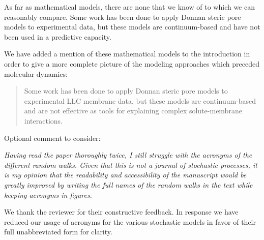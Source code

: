 \documentclass{article}
\begin{document}
\begin{enumerate}[label={Comment \theenumi :}, leftmargin=3.9\parindent]
		  As far as mathematical models, there are none that we know of to which we can reasonably
		  compare. Some work has been done to apply Donnan steric pore models to experimental data, 
		  but these models are continuum-based and have not been used in a predictive capacity.
		  
		  We have added a mention of these mathematical models to the introduction in order to give
		  a more complete picture of the modeling approaches which preceded molecular dynamics:
		  \begin{quote}
		    Some work has been done to apply Donnan steric pore models to experimental LLC membrane 
		    data, but these models are continuum-based and are not effective as tools for explaining
		    complex solute-membrane interactions.~\cite{hatakeyama_water_2011}
		  \end{quote}
		  
  \end{enumerate}

\noindent Optional comment to consider:\\
\begin{addmargin}[5.8em]{0em}
	\textit{Having read the paper thoroughly twice, I still struggle with the acronyms of the different random
	walks. Given that this is not a journal of stochastic processes, it is my opinion that the readability
	and accessibility of the manuscript would be greatly improved by writing the full names of the
	random walks in the text while keeping acronyms in figures. \\}
	
	We thank the reviewer for their constructive feedback. In response we have reduced our usage of
	acronyms for the various stochastic models in favor of their full unabbreviated form for clarity.
	
\end{addmargin}
\end{document}
